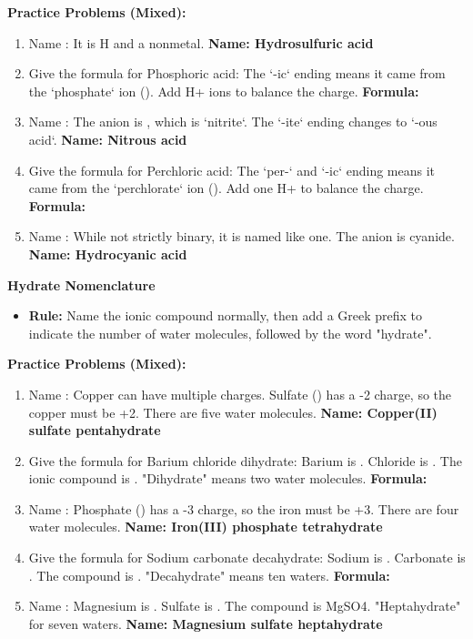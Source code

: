 \documentclass{article}
\begin{document}
\textbf{Practice Problems (Mixed):}
\begin{enumerate}[itemsep=5pt]
    \item Name : It is H and a nonmetal. \textbf{Name: Hydrosulfuric acid}
    \item Give the formula for Phosphoric acid: The `-ic` ending means it came from the `phosphate` ion (). Add H+ ions to balance the charge. \textbf{Formula: }
    \item Name : The anion is , which is `nitrite`. The `-ite` ending changes to `-ous acid`. \textbf{Name: Nitrous acid}
    \item Give the formula for Perchloric acid: The `per-` and `-ic` ending means it came from the `perchlorate` ion (). Add one H+ to balance the charge. \textbf{Formula: }
    \item Name : While not strictly binary, it is named like one. The anion is cyanide. \textbf{Name: Hydrocyanic acid}
\end{enumerate}

\bigskip
\textbf{Hydrate Nomenclature}
\begin{itemize}[itemsep=5pt]
    \item \textbf{Rule:} Name the ionic compound normally, then add a Greek prefix to indicate the number of water molecules, followed by the word "hydrate".
\end{itemize}

\textbf{Practice Problems (Mixed):}
\begin{enumerate}[itemsep=5pt]
    \item Name : Copper can have multiple charges. Sulfate () has a -2 charge, so the copper must be +2. There are five water molecules. \textbf{Name: Copper(II) sulfate pentahydrate}
    \item Give the formula for Barium chloride dihydrate: Barium is . Chloride is . The ionic compound is . "Dihydrate" means two water molecules. \textbf{Formula: }
    \item Name : Phosphate () has a -3 charge, so the iron must be +3. There are four water molecules. \textbf{Name: Iron(III) phosphate tetrahydrate}
    \item Give the formula for Sodium carbonate decahydrate: Sodium is . Carbonate is . The compound is . "Decahydrate" means ten waters. \textbf{Formula: }
    \item Name : Magnesium is . Sulfate is . The compound is MgSO4. "Heptahydrate" for seven waters. \textbf{Name: Magnesium sulfate heptahydrate}
\end{enumerate}
\end{document}
